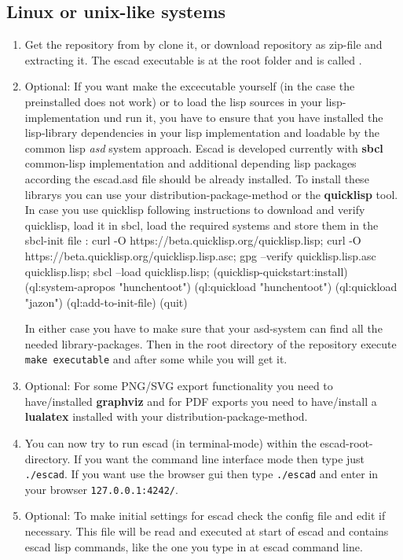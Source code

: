 \documentclass[a4paper, 12pt, openany]{scrbook}
\begin{document}
\subsection{Linux or unix-like systems}
\begin{enumerate}
\item Get the repository from  by clone it, or download repository as zip-file and extracting it. The escad executable is at the root folder and is called .
\item Optional: If you want make the excecutable yourself (in the case the preinstalled does not work) or to load the lisp sources in your lisp-implementation und run it, you have to ensure that you have installed the lisp-library dependencies in your lisp implementation and loadable by the common lisp \emph{asd} system approach. Escad is developed currently with \textbf{sbcl} common-lisp implementation and additional depending lisp packages according the escad.asd file should be already installed. To install these librarys you can use your distribution-package-method or the \textbf{quicklisp} tool. In case you use quicklisp following  instructions to download and verify quicklisp, load it in sbcl, load the required systems and store them in the sbcl-init file : curl -O https://beta.quicklisp.org/quicklisp.lisp; curl -O https://beta.quicklisp.org/quicklisp.lisp.asc; gpg --verify quicklisp.lisp.asc quicklisp.lisp; sbcl --load quicklisp.lisp; (quicklisp-quickstart:install) (ql:system-apropos "hunchentoot") (ql:quickload "hunchentoot") (ql:quickload "jazon") (ql:add-to-init-file) (quit)
  
  In either case you have to make sure that your asd-system can find all the needed library-packages. Then in the root directory of the repository execute \texttt{make executable} and after some while you will get it.
\item Optional: For some PNG/SVG export functionality you need to have/installed \textbf{graphviz} and for PDF exports you need to have/install a \textbf{lualatex} installed with your distribution-package-method.
\item You can now try to run escad (in terminal-mode) within the escad-root-directory. If you want the command line interface mode then type just \texttt{./escad}. If you want use the browser gui then type \texttt{./escad} and enter in your browser \texttt{127.0.0.1:4242/}.
\item Optional: To make initial settings for escad check the config file  and edit if necessary. This file will be read and executed at start of escad and contains escad lisp commands, like the one you type in at escad command line.
\end{enumerate}
\end{document}
